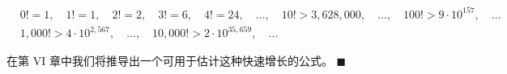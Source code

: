\begin{example}
\begin{items}
\begin{equation*}
\begin{aligned}
&0!=1, \quad 1!=1, \quad 2!=2, \quad 3!=6, \quad 4!=24, \quad \ldots, \quad 10!>3{,}628{,}000, \quad \ldots, \quad 100!>9\cdot10^{157}, \quad \ldots \\ &1{,}000!>4\cdot10^{2{,}567}, \quad \ldots, \quad 10{,}000!>2\cdot10^{35{,}659}, \quad \ldots
\end{aligned}
\end{equation*}

在第 VI 章中我们将推导出一个可用于估计这种快速增长的公式。 $ \blacksquare $

\end{items}

\end{example}

\exerciseshead


